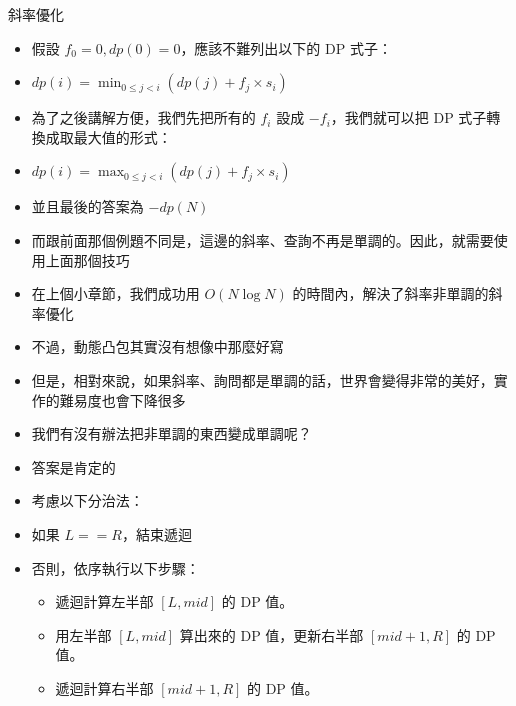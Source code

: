 \documentclass[standalone]{beamer}
\begin{document}
\begin{frame}{斜率優化}
  \begin{itemize}
    \item 假設 $f_0 = 0, dp(0) = 0$，應該不難列出以下的 DP 式子：
    \item $dp(i) = \min_{0 \leq j < i}(dp(j) + f_j \times s_i)$
    \item 為了之後講解方便，我們先把所有的 $f_i$ 設成 $-f_i$，我們就可以把 DP 式子轉換成取最大值的形式：
    \item $dp(i) = \max_{0 \leq j < i}(dp(j) + f_j \times s_i)$
    \item 並且最後的答案為 $-dp(N)$
    \item 而跟前面那個例題不同是，這邊的斜率、查詢不再是單調的。因此，就需要使用上面那個技巧
  \end{itemize}
\end{frame}

\begin{frame}{}
  \begin{itemize}
    \item 在上個小章節，我們成功用 $O(N \log N)$ 的時間內，解決了斜率非單調的斜率優化
    \item 不過，動態凸包其實沒有想像中那麼好寫
    \item 但是，相對來說，如果斜率、詢問都是單調的話，世界會變得非常的美好，實作的難易度也會下降很多
    \item 我們有沒有辦法把非單調的東西變成單調呢？
    \item 答案是肯定的
  \end{itemize}
\end{frame}

\begin{frame}{}
  \begin{itemize}
    \item 考慮以下分治法：
    \item 如果 $L == R$，結束遞迴
    \item 否則，依序執行以下步驟：
    \begin{itemize}
      \item 遞迴計算左半部 $[L, mid]$ 的 DP 值。
      \item 用左半部 $[L, mid]$ 算出來的 DP 值，更新右半部 $[mid + 1, R]$ 的 DP 值。
      \item 遞迴計算右半部 $[mid + 1, R]$ 的 DP 值。
    \end{itemize}
  \end{itemize}
\end{frame}
\end{document}
